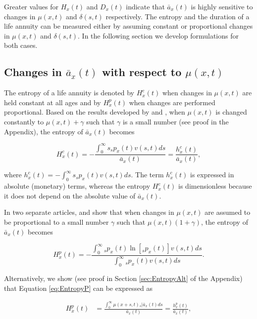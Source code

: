 \documentclass[12pt]{article}
\begin{document}
Greater values for ${H}_{x}(t)$ and ${D}_{x}(t)$ indicate that $\bar{a}_x(t)$ is highly sensitive to changes in $\mu(x,t)$ and $\delta(s,t)$ respectively. The entropy and the duration of a life annuity can be measured either by assuming constant or proportional changes in $\mu(x,t)$ and $\delta(s,t)$. In the following section we develop formulations for both cases. 



\subsection{Changes in $\bar{a}_x(t)$ with respect to $\mu(x,t)$}

The entropy of a life annuity is denoted by ${H}^{c}_{x}(t)$ when changes in $\mu(x,t)$ are held constant at all ages and by ${H}^{p}_{x}(t)$ when  changes are performed proportional. Based on the results developed by \citet{Tsai2013a} and \citet{Lin2020}, when $\mu(x,t)$ is changed constantly to $\mu(x,t)+\gamma$ such that $\gamma$ is a small number (see proof in the Appendix), the entropy of $\bar{a}_x(t)$ becomes

\begin{equation}\label{eq:EntropyC}
{H}^{c}_{x}(t) = -\frac{\int_{0}^\infty s {}_sp_x(t) {v}(s,t) ds}{\bar{a}_x(t)}=\frac{{h}^{c}_{x}(t)}{\bar{a}_x(t)},
\end{equation}

where ${h}^{c}_{x}(t)=-\int_{0}^\infty s {}_sp_x(t) {v}(s,t) ds$. The term ${h}^{c}_{x}(t)$ is expressed in absolute (monetary) terms, whereas the entropy ${H}^{c}_{x}(t)$ is dimensionless because it does not depend on the absolute value of $\bar{a}_x(t)$.


In two separate articles, \citet{Haberman2011} and \citet{Tsai2013a} show that when changes in $\mu(x,t)$ are assumed to be proportional to a small number $\gamma$ such that $\mu(x,t)(1+\gamma)$, the entropy of $\bar{a}_x(t)$ becomes

\begin{equation} \label{eq:EntropyP}
{H}^{p}_{x}(t) = -\frac{ \int_{0}^{\infty}{}_sp_x(t)\ln[{}_sp_x(t)] {v}(s,t) ds}{\int_0^\infty {}_sp_x(t) {v}(s,t) ds}.
\end{equation}


Alternatively, we show (see proof in Section \ref{sec:EntropyAlt} of the Appendix) that Equation \ref{eq:EntropyP} can be expressed as

\begin{equation} \label{eq:EntropyP2}
\begin{split}
{H}^{p}_{x}(t) &=  \frac{\int_0^\infty \mu(x+s,t)   {}_s|\bar{a}_x(t) ds}{\bar{a}_x(t)} =  \frac{{h}^{p}_{x}(t)}{\bar{a}_x(t)}, 
\end{split}
\end{equation}
\end{document}
